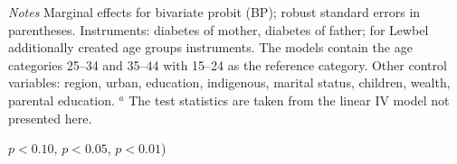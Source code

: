\begin{table}[ph]
\begin{center}
\begin{adjustbox}{max width=\textwidth, center}
\begin{threeparttable}
{\begin{tabular}{l*{4}{S S}}
 \end{tabular}
\begin{tablenotes}
\item \textit{Notes}  Marginal effects for bivariate probit (BP); robust standard errors in parentheses. Instruments: diabetes of mother, diabetes of father; for Lewbel additionally created age groups instruments. The models contain the age categories 25--34 and 35--44 with 15--24 as the reference category. Other control variables: region, urban, education, indigenous, marital status, children, wealth, parental education. $^a$ The test statistics are taken from the linear IV model not presented here.
\item \sym{*} \(p<0.10\), \sym{**} \(p<0.05\), \sym{***} \(p<0.01\))
\end{tablenotes}
}
\end{threeparttable} 
\end{adjustbox}
\end{center}
\end{table}


\clearpage

